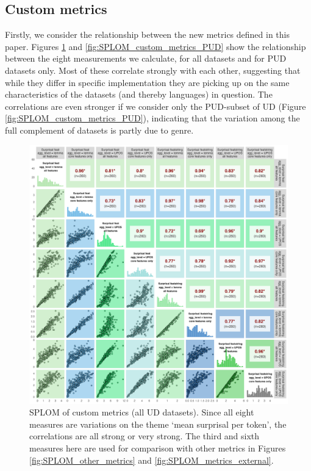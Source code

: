 \documentclass[USenglish]{article}
\begin{document}
\subsection{Custom metrics}

Firstly, we consider the relationship between the new metrics defined in this paper. 
Figures \ref{fig:SPLOM_custom_metrics} and \ref{fig:SPLOM_custom_metrics_PUD} show the relationship between the eight measurements we calculate, for all datasets and for PUD datasets only. 
Most of these correlate strongly with each other, suggesting that while they differ in specific implementation they are picking up on the same characteristics of the datasets (and thereby languages) in question. 
The correlations are even stronger if we consider only the PUD-subset of UD (Figure \ref{fig:SPLOM_custom_metrics_PUD}), indicating that the variation among the full complement of datasets is partly due to genre.


\begin{figure}
    \centering
    \includegraphics[width=1\linewidth]{latex/graphics/SPLOM_custom_metrics.png}
    \caption{SPLOM of custom metrics (all UD datasets). Since all eight measures are variations on the theme `mean surprisal per token', the correlations are all strong or very strong. The third and sixth measures here are used for comparison with other metrics in Figures \ref{fig:SPLOM_other_metrics} and \ref{fig:SPLOM_metrics_external}.}
    \label{fig:SPLOM_custom_metrics}
\end{figure}
\end{document}
